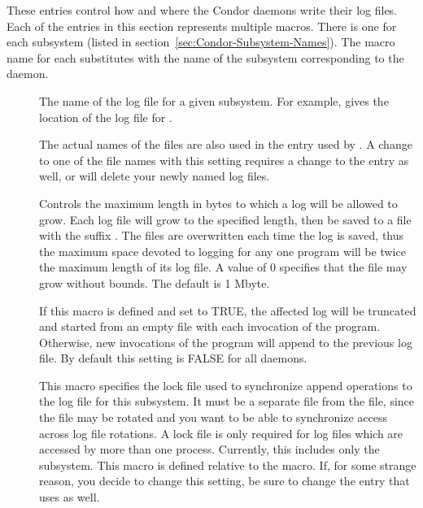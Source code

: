 These entries control how and where the Condor daemons write their log
files.  Each of the entries in this section represents multiple
macros. There is one for each subsystem (listed
in section~\ref{sec:Condor-Subsystem-Names}).
The macro name for each substitutes  with the name
of the subsystem corresponding to the daemon.
\begin{description}
  
\item[] \label{param:SubsysLog} The name of
  the log file for a given subsystem.  For example,
   gives the location of the log file for
  .

  The actual names of the files
  are also used in the  entry used by
  .  A change to one of the
  file names with this setting requires a change to the
   entry as well, or  will
  delete your newly named log files.

\item[] \label{param:MaxSubsysLog} Controls
  the maximum length in bytes to which a
  log will be allowed to grow.  Each log file will grow to the
  specified length, then be saved to a file with the suffix
  .  The 
  files are overwritten each time the log is saved, thus the maximum
  space devoted to logging for any one program will be twice the
  maximum length of its log file.  A value of 0 specifies that the
  file may grow without bounds.  The default is 1 Mbyte.

\item[]
  \label{param:TruncSubsysLogOnOpen}  If this macro is defined and set
  to TRUE, the affected log will be truncated and started from an
  empty file with each invocation of the program.  Otherwise, new
  invocations of the program will append to the previous log
  file.  By default this setting is FALSE for all daemons. 

\item[] \label{param:SubsysLock} This macro
  specifies the lock file used to synchronize append operations to the
  log file for this subsystem.  It must be a separate file from the
   file, since the  file may be
  rotated and you want to be able to synchronize access across log
  file rotations.  A lock file is only required for log files which
  are accessed by more than one process.  Currently, this includes
  only the  subsystem.  This macro is defined relative
  to the  macro.  If, for some strange
  reason, you decide to change this setting, be sure to change the
   entry that  uses as well.


\end{description}
